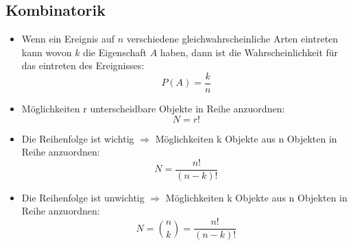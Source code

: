 \documentclass[10pt,a4paper]{article}
\begin{document}
\subsection{Kombinatorik}
\begin{itemize}
\item Wenn ein Ereignis auf $n$ verschiedene gleichwahrscheinliche Arten eintreten kann wovon $k$ die Eigenschaft $A$ haben, dann ist die Wahrscheinlichkeit für das eintreten des Ereignisses:
\begin{equation}
P(A)=\frac{k}{n}
\end{equation} 
\item Möglichkeiten r unterscheidbare Objekte in Reihe anzuordnen:
\begin{equation}
N=r!
\end{equation}
\item Die Reihenfolge ist wichtig $\Rightarrow$ Möglichkeiten k Objekte aus n Objekten in Reihe anzuordnen:
\begin{equation}
N=\frac{n!}{(n-k)!}
\end{equation}
\item Die Reihenfolge ist unwichtig $\Rightarrow$ Möglichkeiten k Objekte aus n Objekten in Reihe anzuordnen:
\begin{equation}
N=\binom{n}{k}=\frac{n!}{(n-k)!}
\end{equation}
\end{itemize}
\end{document}
